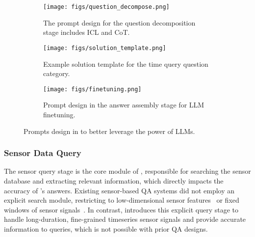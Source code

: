 \begin{figure}[t]
    \centering    
    \begin{subfigure}[b]{0.95\textwidth}
        \centering
        \texttt{[image: figs/question\_decompose.png]}
        \vspace{-6mm}
        \caption{The prompt design for the question decomposition stage includes ICL and CoT.}
        \label{fig:question-decompose}
    \end{subfigure}

    \begin{subfigure}[b]{0.95\textwidth}
        \centering
        \texttt{[image: figs/solution\_template.png]}
        \vspace{-6mm}
        \caption{Example solution template for the time query question category.}
        \label{fig:solution-template}
    \end{subfigure} %

    \begin{subfigure}[b]{0.6\textwidth}
        \centering
        \texttt{[image: figs/finetuning.png]}
        \vspace{-2mm}
        \caption{Prompt design in the answer assembly stage for LLM finetuning.}
        \label{fig:finetuning}
    \end{subfigure}
    \vspace{-4mm}
    \caption{Prompts design in \Method to better leverage the power of LLMs.}
    \label{fig:prompts}
    \vspace{-4mm}
\end{figure}


\subsubsection{Sensor Data Query}
\label{sec:sensor-data-query}

The sensor query stage is the core module of \Method, responsible for searching the sensor database and extracting relevant information, which directly impacts the accuracy of \Method's answers.
Existing sensor-based QA systems did not employ an explicit search module, restricting to low-dimensional sensor features~\cite{englhardt2024classification,kim2024health,yang2024drhouse} or fixed windows of sensor signals~\cite{xing2021deepsqa,moon-etal-2023-imu2clip,moon2023anymal,chen2024sensor2text,arakawa2024prism}.
In contrast, \Method introduces this explicit query stage to handle long-duration, fine-grained timeseries sensor signals and provide accurate information to queries, which is not possible with prior QA designs.

